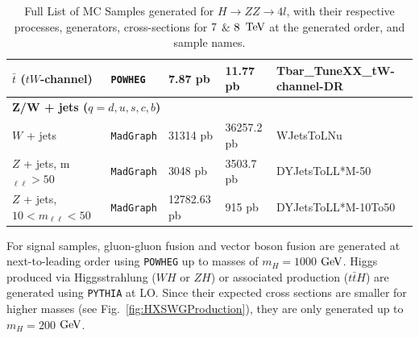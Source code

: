 \begin{table}[htbp]
\begin{center}
\begin{tabular}{lllll}
\small   $\bar{t}$ ($tW$-channel)   	& \small{\tt POWHEG} 		& \small 7.87 pb 	& \small 11.77 pb				& \small{\small Tbar\_TuneXX\_tW-channel-DR} \\ 
\hline %
          \multicolumn{5}{l}{\bf{Z/W + jets ($q=d,u,s,c,b$)}} \\     
\small   $W$ + jets     			& \small{\tt MadGraph}		& \small 31314 pb         & \small 36257.2 pb			& \small{\small WJetsToLNu} \\
\small   $Z$ + jets, m$_{\ell\ell}>50$     		& \small{\tt MadGraph}		& \small 3048 pb           & \small 3503.7 pb			& \small{\small DYJetsToLL*M-50} \\ 
\small   $Z$ + jets, $10<m_{\ell\ell}<50$     	& \small{\tt MadGraph}		& \small 12782.63 pb    & \small 915   pb			& \small{\small DYJetsToLL*M-10To50} \\ 
\hline %
   \end{tabular}
\caption[MC Samples for $H\rightarrow ZZ\rightarrow 4l$]{Full List of MC Samples generated for $H\rightarrow ZZ\rightarrow 4l$, with their respective processes, generators, cross-sections for $\rm{7}$ $\&$ $\rm{8}$ $\rm{TeV}$ at the generated order, and sample names.}
  \label{tbl:MCSamples}
  \end{center}
\end{table}

For signal samples, gluon-gluon fusion and vector boson fusion are generated at next-to-leading order using {\tt POWHEG} \cite{} up to masses of $m_H = 1000$ $\rm{GeV}$. Higgs produced via Higgsstrahlung ($WH$ or $ZH$) or associated production ($t\bar{t}H$) are generated using {\tt PYTHIA} \cite{} at LO. Since their expected cross sections are smaller for higher masses (see Fig.~\ref{fig:HXSWGProduction}), they are only generated up to $m_H=200$ $\rm{GeV}$.

